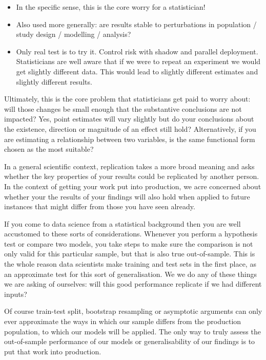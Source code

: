 \documentclass[
  12pt,
]{book}
\begin{document}
\begin{itemize}
\item
  In the specific sense, this is the core worry for a statistician!
\item
  Also used more generally: are results stable to perturbations in population / study design / modelling / analysis?
\item
  Only real test is to try it. Control risk with shadow and parallel deployment.
  Statisticians are well aware that if we were to repeat an experiment we would get slightly different data. This would lead to slightly different estimates and slightly different results.
\end{itemize}

Ultimately, this is the core problem that statisticians get paid to worry about: will those changes be small enough that the substantive conclusions are not impacted? Yes, point estimates will vary slightly but do your conclusions about the existence, direction or magnitude of an effect still hold? Alternatively, if you are estimating a relationship between two variables, is the same functional form chosen as the most suitable?

In a general scientific context, replication takes a more broad meaning and asks whether the key properties of your results could be replicated by another person. In the context of getting your work put into production, we acre concerned about whether your the results of your findings will also hold when applied to future instances that might differ from those you have seen already.

If you come to data science from a statistical background then you are well accustomed to these sorts of considerations. Whenever you perform a hypothesis test or compare two models, you take steps to make sure the comparison is not only valid for this particular sample, but that is also true out-of-sample. This is the whole reason data scientists make training and test sets in the first place, as an approximate test for this sort of generalisation. We we do any of these things we are asking of ourselves: will this good performance replicate if we had different inputs?

Of course train-test split, bootstrap resampling or asymptotic arguments can only ever approximate the ways in which our sample differs from the production population, to which our models will be applied. The only way to truly assess the out-of-sample performance of our models or generalisability of our findings is to put that work into production.
\end{document}
